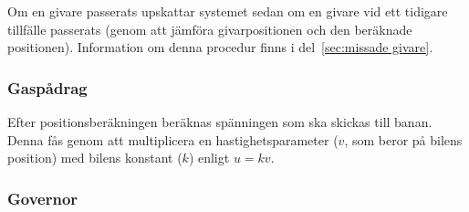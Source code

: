 Om en givare passerats upskattar systemet sedan om en givare vid ett tidigare
tillfälle passerats (genom att jämföra givarpositionen och den beräknade
positionen). Information om denna procedur finns i del~\ref{sec:missade givare}.


\subsubsection{Gaspådrag}

Efter positionsberäkningen beräknas spänningen som ska skickas till banan. Denna
fås genom att multiplicera en hastighetsparameter ($v$, som beror på bilens
position) med bilens konstant ($k$) enligt $u = kv$.


% 
%  

\subsubsection{Governor}
\label{sec:systembeskrivning:governor}


